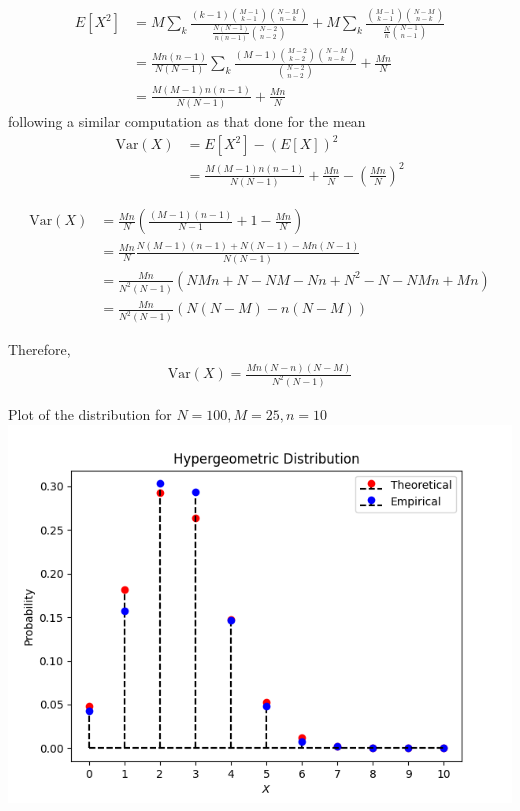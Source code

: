 \documentclass{beamer}
\providecommand{\brak}[1]{\ensuremath{\left(#1\right)}}
\begin{document}
	\begin{frame}
	\begin{align}
		E[X^2] &= M \sum_k \frac{(k-1) \binom{M-1}{k-1} \binom{N-M}{n-k}}{\frac{N(N-1)}{n(n-1)}\binom{N-2}{n-2}} + M \sum_k \frac{\binom{M-1}{k-1} \binom{N-M}{n-k}}{\frac{N}{n} \binom{N-1}{n-1}} \\ 
		&= \frac{Mn(n-1)}{N(N-1)} \sum_k \frac{(M-1) \binom{M-2}{k-2} \binom{N-M}{n-k}}{\binom{N-2}{n-2}} + \frac{Mn}{N} \\
		&= \frac{M(M-1)n(n-1)}{N(N-1)} + \frac{Mn}{N}
	\end{align}
	following a similar computation as that done for the mean
	\begin{align}
		\mathrm{Var}(X) &= E[X^2] - \brak{E[X]}^2 \\
		&= \frac{M(M-1)n(n-1)}{N(N-1)} + \frac{Mn}{N} - \brak{\frac{Mn}{N}}^2
	\end{align}
	\end{frame}
		
	\begin{frame}
	\begin{align}
		\mathrm{Var}(X) &= \frac{Mn}{N} \brak{\frac{(M-1)(n-1)}{N-1} + 1 - \frac{Mn}{N}} \\
		&= \frac{Mn}{N} \frac{N(M-1)(n-1) + N(N-1) - Mn(N-1)}{N(N-1)} \\
		&= \frac{Mn}{N^2(N-1)} \brak{NMn + N - NM - Nn + N^2 - N - NMn + Mn} \\
		&= \frac{Mn}{N^2(N-1)} (N(N-M) - n(N-M))
	\end{align}
	\begin{block}{}
	Therefore,
		\begin{align}
			\mathrm{Var}(X) = \frac{Mn(N-n)(N-M)}{N^2(N-1)}
		\end{align}
	\end{block}
	\end{frame}
	
	\begin{frame}{Plot of the distribution for $N=100, M=25, n=10$}
		\centering
		\includegraphics[height=0.8\paperheight]{figs/fig-1.png}
	\end{frame}
	
\end{document}
